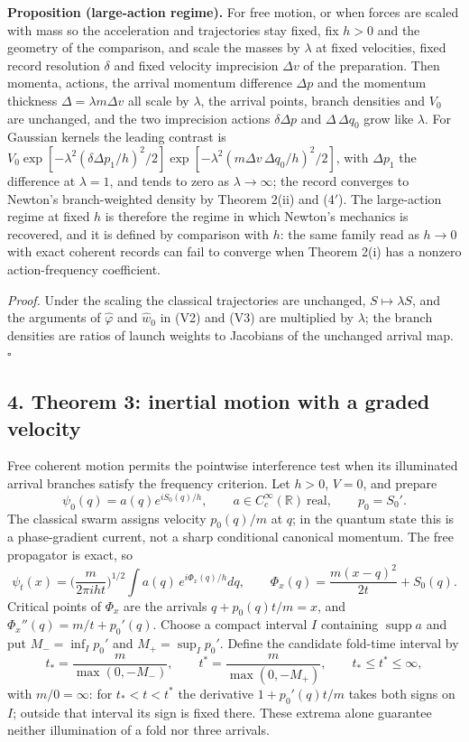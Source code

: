 \documentclass[11pt,a4paper]{article}
\begin{document}
\textbf{Proposition (large-action regime).} For free motion, or when
forces are scaled with mass so the acceleration and trajectories stay
fixed, fix \(h>0\) and the geometry of the comparison, and scale the
masses by \(\lambda\) at fixed velocities, fixed record resolution
\(\delta\) and fixed velocity imprecision \(\Delta v\) of the
preparation. Then momenta, actions, the arrival momentum difference
\(\Delta p\) and the momentum thickness \(\Delta=\lambda m\Delta v\) all
scale by \(\lambda\), the arrival points, branch densities and \(V_0\)
are unchanged, and the two imprecision actions \(\delta\Delta p\) and
\(\Delta\,\Delta q_0\) grow like \(\lambda\). For Gaussian kernels the
leading contrast is
\(V_0\exp[-\lambda^2(\delta\Delta p_1/h)^2/2]\exp[-\lambda^2(m\Delta v\,\Delta q_0/h)^2/2]\),
with \(\Delta p_1\) the difference at \(\lambda=1\), and tends to zero
as \(\lambda\to\infty\); the record converges to Newton's
branch-weighted density by Theorem 2(ii) and (4\('\)). The large-action
regime at fixed \(h\) is therefore the regime in which Newton's
mechanics is recovered, and it is defined by comparison with \(h\): the
same family read as \(h\to0\) with exact coherent records can fail to
converge when Theorem 2(i) has a nonzero action-frequency coefficient.

\emph{Proof.} Under the scaling the classical trajectories are
unchanged, \(S\mapsto\lambda S\), and the arguments of \(\hat\varphi\)
and \(\hat w_0\) in (V2) and (V3) are multiplied by \(\lambda\); the
branch densities are ratios of launch weights to Jacobians of the
unchanged arrival map. \(\square\)

\hypertarget{theorem-3-inertial-motion-with-a-graded-velocity}{%
\subsection{4. Theorem 3: inertial motion with a graded
velocity}\label{theorem-3-inertial-motion-with-a-graded-velocity}}

Free coherent motion permits the pointwise interference test when its
illuminated arrival branches satisfy the frequency criterion. Let
\(h>0\), \(V=0\), and prepare
\[\psi_0(q)=a(q)e^{iS_0(q)/h},\qquad a\in C_c^\infty(\mathbb R)\ \text{real},
\qquad p_0=S_0'.\tag{5}\] The classical swarm assigns velocity
\(p_0(q)/m\) at \(q\); in the quantum state this is a phase-gradient
current, not a sharp conditional canonical momentum. The free propagator
is exact, so \[\psi_t(x)=\Big(\frac{m}{2\pi iht}\Big)^{1/2}\int a(q)\,
e^{i\Phi_x(q)/h}dq,\qquad
\Phi_x(q)=\frac{m(x-q)^2}{2t}+S_0(q).\tag{6}\] Critical points of
\(\Phi_x\) are the arrivals \(q+p_0(q)t/m=x\), and
\(\Phi_x''(q)=m/t+p_0'(q)\). Choose a compact interval \(I\) containing
\(\operatorname{supp}a\) and put \(M_-=\inf_I p_0'\) and
\(M_+=\sup_I p_0'\). Define the candidate fold-time interval by
\[t_*=\frac{m}{\max(0,-M_-)},\qquad t^*=\frac{m}{\max(0,-M_+)},\qquad
t_*\le t^*\le\infty,\tag{7}\] with \(m/0=\infty\): for \(t_*<t<t^*\) the
derivative \(1+p_0'(q)t/m\) takes both signs on \(I\); outside that
interval its sign is fixed there. These extrema alone guarantee neither
illumination of a fold nor three arrivals.
\end{document}
